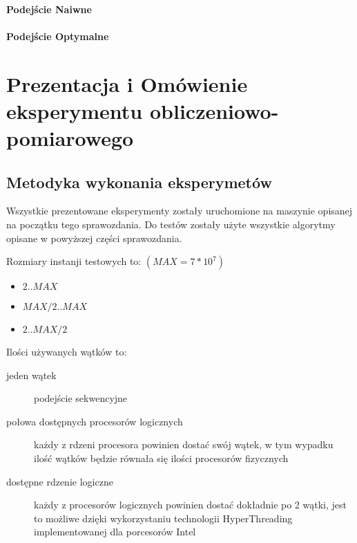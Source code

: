 \documentclass{article}
\begin{document}
                    \paragraph{Podejście Naiwne}
                    \paragraph{Podejście Optymalne}
    
    \section{Prezentacja i Omówienie eksperymentu obliczeniowo-pomiarowego}
        \subsection{Metodyka wykonania eksperymetów}
                Wszystkie prezentowane eksperymenty zostały uruchomione na maszynie opisanej na początku tego sprawozdania. Do testów zostały użyte wszystkie algorytmy opisane w powyższej części sprawozdania.
                
                \noindent
                Rozmiary instanji testowych to: $(MAX = 7 * 10^7)$
                \begin{itemize}
                    \item $2 .. MAX$
                    \item $MAX / 2 .. MAX$
                    \item $2 .. MAX / 2$
                \end{itemize}
                
                \noindent
                Ilości używanych wątków to:
                \begin{description}
                    \item[jeden wątek] podejście sekwencyjne
                    \item[połowa dostępnych procesorów logicznych] każdy z rdzeni procesora powinien dostać swój wątek, w tym wypadku ilość wątków będzie równała się ilości procesorów fizycznych
                    \item[dostępne rdzenie logiczne] każdy z procesorów logicznych powinien dostać dokładnie po 2 wątki, jest to możliwe dzięki wykorzystaniu technologii HyperThreading implementowanej dla porcesorów Intel
                \end{description}
        
\end{document}
